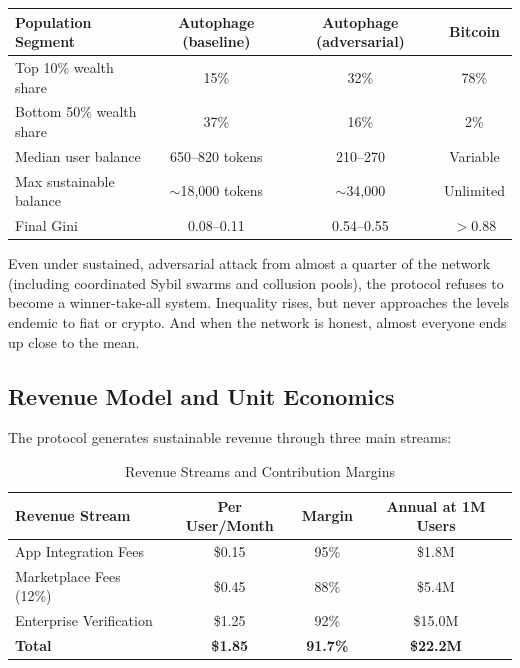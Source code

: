 \documentclass[11pt,letterpaper]{article}
\begin{document}

\begin{table}[H]
\centering
\begin{tabular}{lccc}
\toprule
\textbf{Population Segment} & \textbf{Autophage (baseline)} & \textbf{Autophage (adversarial)} & \textbf{Bitcoin} \\
\midrule
Top 10\% wealth share & 15\% & 32\% & 78\% \\
Bottom 50\% wealth share & 37\% & 16\% & 2\% \\
Median user balance & 650--820 tokens & 210--270 & Variable \\
Max sustainable balance & $\sim$18,000 tokens & $\sim$34,000 & Unlimited \\
Final Gini & 0.08--0.11 & 0.54--0.55 & $>$0.88 \\
\bottomrule
\end{tabular}
\end{table}

Even under sustained, adversarial attack from almost a quarter of the network (including coordinated Sybil swarms and collusion pools), the protocol refuses to become a winner-take-all system. Inequality rises, but never approaches the levels endemic to fiat or crypto. And when the network is honest, almost everyone ends up close to the mean.

\subsection{Revenue Model and Unit Economics}

The protocol generates sustainable revenue through three main streams:

\begin{table}[H]
\centering
\caption{Revenue Streams and Contribution Margins}
\begin{tabular}{lccc}
\toprule
\textbf{Revenue Stream} & \textbf{Per User/Month} & \textbf{Margin} & \textbf{Annual at 1M Users} \\
\midrule
App Integration Fees & \$0.15 & 95\% & \$1.8M \\
Marketplace Fees (12\%) & \$0.45 & 88\% & \$5.4M \\
Enterprise Verification & \$1.25 & 92\% & \$15.0M \\
\midrule
\textbf{Total} & \textbf{\$1.85} & \textbf{91.7\%} & \textbf{\$22.2M} \\
\bottomrule
\end{tabular}
\end{table}
\end{document}
